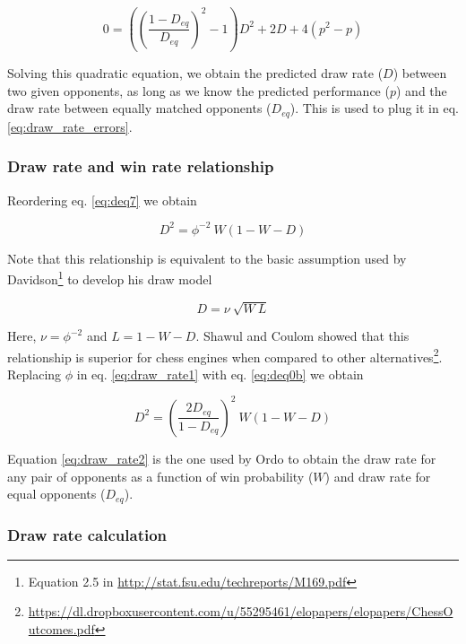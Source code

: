 \documentclass[12pt]{article}
\begin{document}
	\begin{equation} \label{eq:deq11}
	0 = \left( 
			\left(\frac {1-D_{eq}} 
			{D_{eq}}
			\right) ^2 -1
		\right) 
		D^2 + 2 D + 4 (p^2 - p)
	\end{equation}

Solving this quadratic equation, we obtain the predicted draw rate ($D$) between two given opponents, as long as we know the predicted performance ($p$) and the draw rate between equally matched opponents ($D_{eq}$). This is used to plug it in eq. \ref{eq:draw_rate_errors}.

\subsubsection*{Draw rate and win rate relationship}

Reordering eq. \ref{eq:deq7} we obtain

	\begin{equation} \label{eq:draw_rate1}
	D^2 = \phi^{-2}\: W (1 - W - D)  
	\end{equation}

Note that this relationship is equivalent to the basic assumption used by Davidson\footnote{Equation 2.5 in \url{http://stat.fsu.edu/techreports/M169.pdf}} to develop his draw model

	\begin{equation} \label{eq:drawrate_davidson}
	D = \nu\: \sqrt{W \: L}  
	\end{equation}

Here, $\nu = \phi^{-2}$ and $L = 1 - W - D$. Shawul and Coulom showed that this relationship is superior for chess engines when compared to other alternatives\footnote{\url{https://dl.dropboxusercontent.com/u/55295461/elopapers/elopapers/ChessOutcomes.pdf}}.
Replacing $\phi$ in eq. \ref{eq:draw_rate1} with eq. \ref{eq:deq0b} we obtain

	\begin{equation} \label{eq:draw_rate2}
	D^2 = \left(\frac{2 D_{eq}}{1-D_{eq}}\right)^2\: W (1 - W - D)  
	\end{equation}

Equation \ref{eq:draw_rate2} is the one used by Ordo to obtain the draw rate for any pair of opponents as a function of win probability ($W$) and draw rate for equal opponents ($D_{eq}$).


\subsubsection*{Draw rate calculation}
\end{document}
